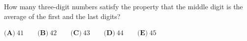 How many three-digit numbers satisfy the property that the middle digit is the average of the first and the last digits?

$\textbf{(A)}\ 41\qquad\textbf{(B)}\ 42\qquad\textbf{(C)}\ 43\qquad\textbf{(D)}\ 44\qquad\textbf{(E)}\ 45$
